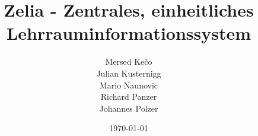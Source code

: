 \title{Zelia - Zentrales, einheitliches Lehrrauminformationssystem }
\author{Mersed Kečo \\
Julian Kusternigg \\
Mario Naunovic \\
Richard Panzer \\
Johannes Polzer 
}
\date{\today}